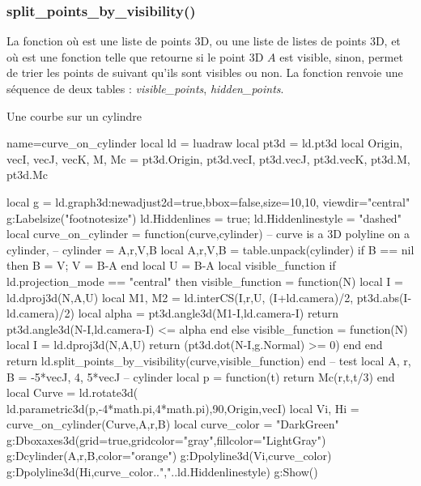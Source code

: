 \subsubsection{split\_points\_by\_visibility()}

La fonction  où  est une liste de points 3D, ou une liste de listes de points 3D, et où  est une fonction telle que  retourne \true si le point 3D $A$ est visible, \false sinon, permet de trier les points de  suivant qu'ils sont visibles ou non. La fonction renvoie une séquence de deux tables : \emph{visible\_points}, \emph{hidden\_points}.

\begin{demo}{Une courbe sur un cylindre}
\begin{luadraw}{name=curve_on_cylinder}
local ld = luadraw
local pt3d = ld.pt3d
local Origin, vecI, vecJ, vecK, M, Mc = pt3d.Origin, pt3d.vecI, pt3d.vecJ, pt3d.vecK, pt3d.M, pt3d.Mc

local g = ld.graph3d:new{adjust2d=true,bbox=false,size={10,10}, viewdir="central"}
g:Labelsize("footnotesize")
ld.Hiddenlines = true; ld.Hiddenlinestyle = "dashed"
local curve_on_cylinder = function(curve,cylinder)
-- curve is a 3D polyline on a cylinder,
-- cylinder = {A,r,V,B}
    local A,r,V,B = table.unpack(cylinder)
    if B == nil then B = V; V = B-A end
    local U = B-A
    local visible_function
    if ld.projection_mode == "central" then
        visible_function = function(N)
            local I = ld.dproj3d(N,{A,U})
            local M1, M2 = ld.interCS({I,r,U},{ (I+ld.camera)/2, pt3d.abs(I-ld.camera)/2})
            local alpha = pt3d.angle3d(M1-I,ld.camera-I)
            return pt3d.angle3d(N-I,ld.camera-I) <= alpha
        end
    else
        visible_function = function(N)
            local I = ld.dproj3d(N,{A,U})
            return (pt3d.dot(N-I,g.Normal) >= 0)
        end
    end
    return ld.split_points_by_visibility(curve,visible_function)
end
-- test
local A, r, B = -5*vecJ, 4, 5*vecJ -- cylinder
local p = function(t) return Mc(r,t,t/3) end
local Curve = ld.rotate3d( ld.parametric3d(p,-4*math.pi,4*math.pi),90,{Origin,vecI})
local Vi, Hi = curve_on_cylinder(Curve,{A,r,B})
local curve_color = "DarkGreen"
g:Dboxaxes3d({grid=true,gridcolor="gray",fillcolor="LightGray"})
g:Dcylinder(A,r,B,{color="orange"})
g:Dpolyline3d(Vi,curve_color)
g:Dpolyline3d(Hi,curve_color..","..ld.Hiddenlinestyle)
g:Show()
\end{luadraw}
\end{demo}
